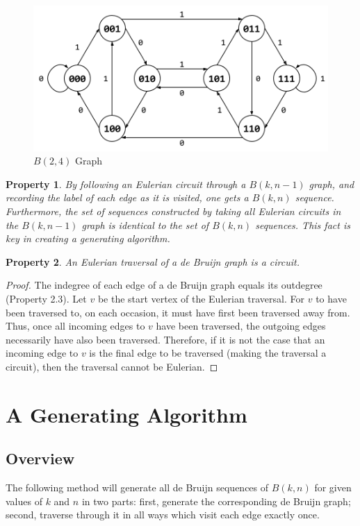 \documentclass[12pt]{article}
\newtheorem{property}{Property}[section]
\begin{document}
\begin{figure}[ht]
\centering
\includegraphics[scale=0.5]{graphics/b24_graph.png}
\caption{$B(2,4)$ Graph}
\label{fig:$B(2,4)$ Graph}
\end{figure}

\begin{property}
\normalfont By following an Eulerian circuit through a $B(k,n-1)$ graph, and recording the label of each edge as it is visited, one gets a $B(k,n)$ sequence. Furthermore, the set of sequences constructed by taking all Eulerian circuits in the $B(k,n-1)$ graph is identical to the set of $B(k,n)$ sequences. This fact is key in creating a generating algorithm. 
\end{property}

\begin{property}
\normalfont An Eulerian traversal of a de Bruijn graph is a circuit.
\end{property}
\begin{proof}
The indegree of each edge of a de Bruijn graph equals its outdegree (Property 2.3). Let $v$ be the start vertex of the Eulerian traversal. For $v$ to have been traversed to, on each occasion, it must have first been traversed away from. Thus, once all incoming edges to $v$ have been traversed, the outgoing edges necessarily have also been traversed. Therefore, if it is not the case that an incoming edge to $v$ is the final edge to be traversed (making the traversal a circuit), then the traversal cannot be Eulerian. 
\end{proof}


\section{A Generating Algorithm}
\subsection{Overview}
The following method will generate all de Bruijn sequences of $B(k,n)$ for given values of $k$ and $n$ in two parts: first, generate the corresponding de Bruijn graph; second, traverse through it in all ways which visit each edge exactly once. 
\end{document}
